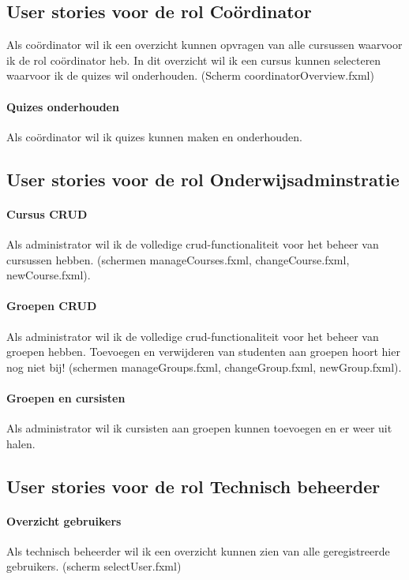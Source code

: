 \documentclass[11pt, a4paper]{article}
\begin{document}
\subsection{User stories voor de rol Co\"ordinator}

Als co\"ordinator wil ik een overzicht kunnen opvragen van alle cursussen waarvoor ik de rol co\"ordinator heb.
In dit overzicht wil ik een cursus kunnen selecteren waarvoor ik de quizes wil onderhouden. (Scherm coordinatorOverview.fxml)

\paragraph{Quizes onderhouden}
Als co\"ordinator wil ik quizes kunnen maken en onderhouden.

\subsection{User stories voor de rol Onderwijsadminstratie}

\paragraph{Cursus CRUD}
Als administrator wil ik de volledige crud-functionaliteit voor het beheer van cursussen hebben. (schermen manageCourses.fxml, changeCourse.fxml, newCourse.fxml).

\paragraph{Groepen CRUD}
Als administrator wil ik de volledige crud-functionaliteit voor het beheer van groepen hebben. Toevoegen en verwijderen van studenten aan groepen hoort hier nog niet bij! (schermen manageGroups.fxml, changeGroup.fxml, newGroup.fxml).

\paragraph{Groepen en cursisten}
Als administrator wil ik cursisten aan groepen kunnen toevoegen en er weer uit halen.

\subsection{User stories voor de rol Technisch beheerder}

\paragraph{Overzicht gebruikers} Als technisch beheerder wil ik een overzicht kunnen zien van alle geregistreerde gebruikers. (scherm selectUser.fxml)
\end{document}

